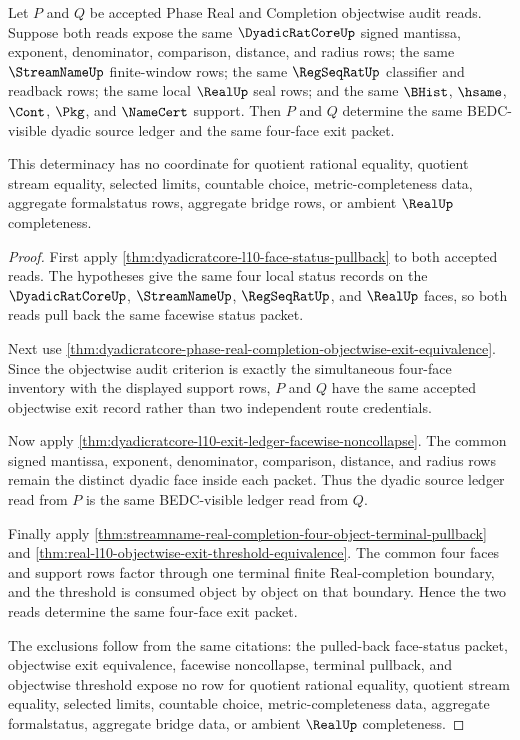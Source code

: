 \begin{theorem}
\label{thm:dyadicratcore-l10-exit-ledger-source-determinacy}
Let $P$ and $Q$ be accepted Phase Real and Completion objectwise audit reads. Suppose both reads expose the same $\DyadicRatCoreUp$ signed mantissa, exponent, denominator, comparison, distance, and radius rows; the same $\StreamNameUp$ finite-window rows; the same $\RegSeqRatUp$ classifier and readback rows; the same local $\RealUp$ seal rows; and the same $\BHist$, $\hsame$, $\Cont$, $\Pkg$, and $\NameCert$ support. Then $P$ and $Q$ determine the same BEDC-visible dyadic source ledger and the same four-face exit packet.

This determinacy has no coordinate for quotient rational equality, quotient stream equality, selected limits, countable choice, metric-completeness data, aggregate formalstatus rows, aggregate bridge rows, or ambient $\RealUp$ completeness.
\end{theorem}
\begin{proof}
First apply \autoref{thm:dyadicratcore-l10-face-status-pullback} to both accepted reads. The hypotheses give the same four local status records on the $\DyadicRatCoreUp$, $\StreamNameUp$, $\RegSeqRatUp$, and $\RealUp$ faces, so both reads pull back the same facewise status packet.

Next use \autoref{thm:dyadicratcore-phase-real-completion-objectwise-exit-equivalence}. Since the objectwise audit criterion is exactly the simultaneous four-face inventory with the displayed support rows, $P$ and $Q$ have the same accepted objectwise exit record rather than two independent route credentials.

Now apply \autoref{thm:dyadicratcore-l10-exit-ledger-facewise-noncollapse}. The common signed mantissa, exponent, denominator, comparison, distance, and radius rows remain the distinct dyadic face inside each packet. Thus the dyadic source ledger read from $P$ is the same BEDC-visible ledger read from $Q$.

Finally apply \autoref{thm:streamname-real-completion-four-object-terminal-pullback} and \autoref{thm:real-l10-objectwise-exit-threshold-equivalence}. The common four faces and support rows factor through one terminal finite Real-completion boundary, and the threshold is consumed object by object on that boundary. Hence the two reads determine the same four-face exit packet.

The exclusions follow from the same citations: the pulled-back face-status packet, objectwise exit equivalence, facewise noncollapse, terminal pullback, and objectwise threshold expose no row for quotient rational equality, quotient stream equality, selected limits, countable choice, metric-completeness data, aggregate formalstatus, aggregate bridge data, or ambient $\RealUp$ completeness.
\end{proof}

